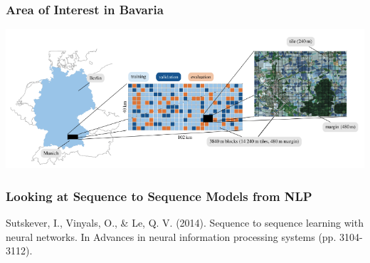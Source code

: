 
\begin{frame}
	\frametitle{Area of Interest in Bavaria}
	\includegraphics[width=\textwidth]{images/aoi}
\end{frame}



\begin{frame}[t]
\frametitle{Looking at Sequence to Sequence Models from NLP}

\begin{center}
	
\end{center}
%	
%	


{\small
	Sutskever, I., Vinyals, O., \& Le, Q. V. (2014). Sequence to sequence learning with neural networks. In Advances in neural information processing systems (pp. 3104-3112).}


\end{frame}


